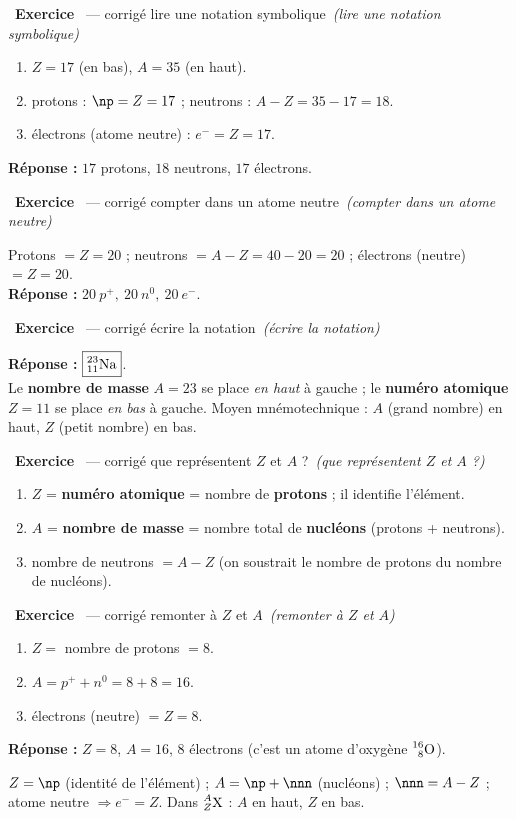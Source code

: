 \documentclass[11pt,a4paper]{article}
\newcommand{\nuc}[3]{\prescript{#1}{#2}{\mathrm{#3}}}
\newcommand{\pp}{p^{+}}
\newcommand{\ee}{e^{-}}
\newcommand{\nz}{n^{0}}
\newcommand{\rep}{\textbf{\color{excol}Réponse : }}
\newcounter{exo}
\newcommand{\cor}[1][]{\stepcounter{exo}\par\medskip%
  \noindent{\color{primary}\rule[-2pt]{3.5pt}{15pt}}\ \textbf{\color{primarydark}\large Exercice \theexo}%
  \ \textmd{\normalsize\color{black!55}— corrigé}%
  \ifx\relax#1\relax\relax\else\ \textmd{\normalsize\color{black!65}\itshape (#1)}\fi\par\nopagebreak\smallskip}
\begin{document}

\cor[lire une notation symbolique]
\begin{enumerate}[label=\alph*)]
  \item $Z = 17$ (en bas), $A = 35$ (en haut).
  \item protons : $\np = Z = 17$ ; neutrons : $A - Z = 35 - 17 = 18$.
  \item électrons (atome neutre) : $\ee = Z = 17$.
\end{enumerate}
\rep $17$ protons, $18$ neutrons, $17$ électrons.

\cor[compter dans un atome neutre]
Protons $= Z = 20$ ; neutrons $= A - Z = 40 - 20 = 20$ ; électrons (neutre) $= Z = 20$.\\
\rep $\boxed{20\ \pp,\ 20\ \nz,\ 20\ \ee}$.

\cor[écrire la notation]
\rep $\boxed{\nuc{23}{11}{Na}}$. \\
Le \textbf{nombre de masse} $A = 23$ se place \emph{en haut} à gauche ; le \textbf{numéro atomique}
$Z = 11$ se place \emph{en bas} à gauche. Moyen mnémotechnique : $A$ (grand nombre) en haut, $Z$ (petit
nombre) en bas.

\cor[que représentent $Z$ et $A$ ?]
\begin{enumerate}[label=\alph*)]
  \item $Z$ = \textbf{numéro atomique} = nombre de \textbf{protons} ; il identifie l'élément.
  \item $A$ = \textbf{nombre de masse} = nombre total de \textbf{nucléons} (protons + neutrons).
  \item nombre de neutrons $= A - Z$ (on soustrait le nombre de protons du nombre de nucléons).
\end{enumerate}

\cor[remonter à $Z$ et $A$]
\begin{enumerate}[label=\alph*)]
  \item $Z = $ nombre de protons $= 8$.
  \item $A = \pp + \nz = 8 + 8 = 16$.
  \item électrons (neutre) $= Z = 8$.
\end{enumerate}
\rep $Z = 8$, $A = 16$, $8$ électrons (c'est un atome d'oxygène $\nuc{16}{8}{O}$).

\begin{bilan}
$Z = \np$ (identité de l'élément) ; $A = \np + \nnn$ (nucléons) ; $\nnn = A - Z$ ; atome neutre
$\Rightarrow \ee = Z$. Dans $\nuc{A}{Z}{X}$ : $A$ en haut, $Z$ en bas.
\end{bilan}
\end{document}
